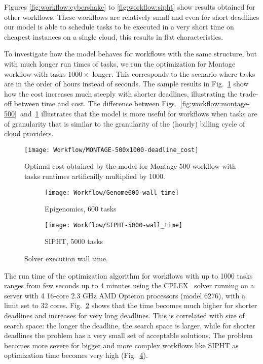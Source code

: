 {    Figures \ref{fig:workflow:cybershake} to \ref{fig:workflow:sipht} show results obtained for other workflows. These workflows are relatively small and even for short deadlines our model is able to schedule tasks to be executed in a very short time on cheapest instances on a single cloud, this results in flat characteristics.
    
    To investigate how the model behaves for workflows with the same structure, but with much longer run times of tasks, we run the optimization for Montage workflow with tasks $1000 \times$ longer. This corresponds to the scenario where tasks are in the order of hours instead of seconds. The sample results in Fig.~\ref{fig:workflow:montage-500x1000} show how the cost increases much steeply with shorter deadlines, illustrating the trade-off between time and cost. The difference between Figs.~\ref{fig:workflow:montage-500}~and~\ref{fig:workflow:montage-500x1000} illustrates that the model is more useful for workflows when tasks are of granularity that is similar to the granularity of the (hourly) billing cycle of cloud providers.    

    \begin{figure}[tb]
       \centering \texttt{[image: Workflow/MONTAGE-500x1000-deadline\_cost]}
       \caption{Optimal cost obtained by the model for Montage 500 workflow with tasks runtimes artificailly 
       multiplied by 1000.
       \label{fig:workflow:montage-500x1000}}
    \end{figure}

    \begin{figure}[tb] 
       \centering
       
       \begin{subfigure}[b]{0.7\textwidth}  
         \texttt{[image: Workflow/Genome600-wall\_time]}
         \caption{Epigenomics, 600 tasks}
         \label{fig:workflow:genome-600-opttime}
       \end{subfigure}
       \begin{subfigure}[b]{0.7\textwidth}
         \texttt{[image: Workflow/SIPHT-5000-wall\_time]}
         \caption{SIPHT, 5000 tasks}
         \label{fig:workflow:sipht-5000-opttime}
       \end{subfigure}
       
       \caption{Solver execution wall time.}
    \end{figure}
  
    
    The run time of the optimization algorithm for workflows with up to 1000 tasks ranges from few seconds up to 4 minutes using the CPLEX~\cite{cplex} solver running on a server with 4 16-core 2.3 GHz AMD Opteron processors (model 6276), with a limit set to 32 cores. Fig.~\ref{fig:workflow:genome-600-opttime} shows that the time becomes much higher for shorter deadlines and increases for very long deadlines. This is correlated with size of search space: the longer the deadline, the search space is larger, while for shorter deadlines the problem has a very small set of acceptable solutions.  The problem becomes more severe for bigger and more complex workflows like SIPHT as optimization time becomes very high (Fig.~\ref{fig:workflow:sipht-5000-opttime}).
    
}
